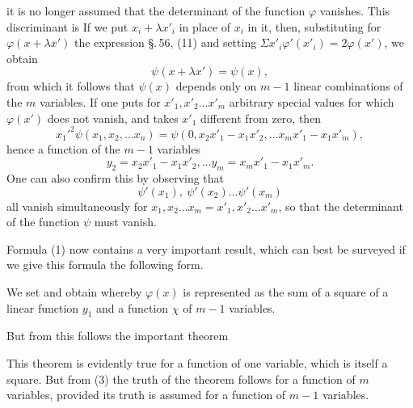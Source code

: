 it is no longer assumed that the determinant of the function $\varphi$
vanishes. This discriminant is
If we put $x_i + \lambda x'_i$ in place of $x_i$ in it, then, substituting
for $\varphi(x + \lambda x')$ the expression \S.\,56, (11)
and setting $\Sigma x'_i \varphi'(x'_i) = 2\varphi(x')$, we obtain
\[
\psi(x + \lambda x') = \psi(x),
\]
from which it follows that $\psi(x)$ depends only on $m - 1$ linear combinations
of the $m$ variables. If one puts for $x'_1, x'_2 \ldots x'_m$
arbitrary special values for which $\varphi(x')$ does not vanish, and
takes $x'_1$ different from zero, then
\[
x_1'^2 \psi(x_1, x_2, \ldots x_n) = \psi(0, x_2 x'_1 - x_1 x'_2, \ldots x_m x'_1 - x_1 x'_m),
\]
hence a function of the $m - 1$ variables
\[
y_2 = x_2 x'_1 - x_1 x'_2, \ldots y_m = x_m x'_1 - x_1 x'_m.
\]
One can also confirm this by observing that
\[
\psi'(x_1), \ \psi'(x_2) \ldots \psi'(x_m)
\]
all vanish simultaneously for $x_1, x_2 \ldots x_m = x'_1, x'_2 \ldots x'_m$,
so that the determinant of the function $\psi$ must vanish.

Formula (1) now contains a very important result, which
can best be surveyed if we give this formula the following
form.

We set
and obtain
whereby $\varphi(x)$ is represented as the sum of a square of a
linear function $y_1$ and a function $\chi$ of $m - 1$ variables.

But from this follows the important theorem


This theorem is evidently true for a function of one
variable, which is itself a square. But from (3) the truth
of the theorem follows for a function of $m$ variables,
provided its truth is assumed for a function of $m - 1$
variables.
